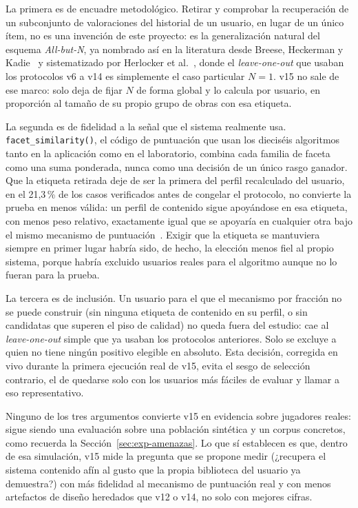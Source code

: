 La primera es de encuadre metodológico. Retirar y comprobar la recuperación de un subconjunto
de valoraciones del historial de un usuario, en lugar de un único ítem, no es una invención de
este proyecto: es la generalización natural del esquema \emph{All-but-N}, ya nombrado así en
la literatura desde Breese, Heckerman y Kadie~\cite{breese1998empirical} y sistematizado por
Herlocker et al.~\cite{herlocker2004evaluating}, donde el \emph{leave-one-out} que usaban los
protocolos v6 a v14 es simplemente el caso particular \(N=1\). v15 no sale de ese marco: solo
deja de fijar \(N\) de forma global y lo calcula por usuario, en proporción al tamaño de su
propio grupo de obras con esa etiqueta.

La segunda es de fidelidad a la señal que el sistema realmente usa. \texttt{facet\_similarity()},
el código de puntuación que usan los dieciséis algoritmos tanto en la aplicación como en el
laboratorio, combina cada familia de faceta como una suma ponderada, nunca como una decisión
de un único rasgo ganador. Que la etiqueta retirada deje de ser la primera del perfil recalculado
del usuario, en el 21{,}3\,\% de los casos verificados antes de congelar el protocolo, no
convierte la prueba en menos válida: un perfil de contenido sigue apoyándose en esa etiqueta,
con menos peso relativo, exactamente igual que se apoyaría en cualquier otra bajo el mismo
mecanismo de puntuación~\cite{pazzani2007content}. Exigir que la etiqueta se mantuviera siempre
en primer lugar habría sido, de hecho, la elección menos fiel al propio sistema, porque
habría excluido usuarios reales para el algoritmo aunque no lo fueran para la prueba.

La tercera es de inclusión. Un usuario para el que el mecanismo por fracción no se puede
construir (sin ninguna etiqueta de contenido en su perfil, o sin candidatas que superen el piso
de calidad) no queda fuera del estudio: cae al \emph{leave-one-out} simple que ya usaban los
protocolos anteriores. Solo se excluye a quien no tiene ningún positivo elegible en absoluto.
Esta decisión, corregida en vivo durante la primera ejecución real de v15, evita el sesgo de
selección contrario, el de quedarse solo con los usuarios más fáciles de evaluar y llamar a
eso representativo.

Ninguno de los tres argumentos convierte v15 en evidencia sobre jugadores reales: sigue siendo
una evaluación sobre una población sintética y un corpus concretos, como recuerda la
Sección~\ref{sec:exp-amenazas}. Lo que sí establecen es que, dentro de esa simulación, v15
mide la pregunta que se propone medir (¿recupera el sistema contenido afín al gusto que la
propia biblioteca del usuario ya demuestra?) con más fidelidad al mecanismo de puntuación real
y con menos artefactos de diseño heredados que v12 o v14, no solo con mejores cifras.

